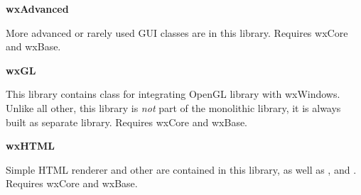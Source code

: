 {\large {\bf wxAdvanced}}

More advanced or rarely used GUI classes are in this library.
Requires wxCore and wxBase.

{\large {\bf wxGL}}

This library contains  class for integrating
OpenGL library with wxWindows. Unlike all other, this library is {\em not}
part of the monolithic library, it is always built as separate library.
Requires wxCore and wxBase.

{\large {\bf wxHTML}}

Simple HTML renderer and other  are
contained in this library, as well as
,
 and
. Requires wxCore and wxBase.
